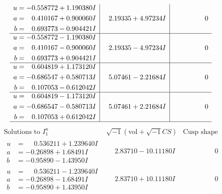 \documentclass[1p]{elsarticle_modified}
\theoremstyle{definition}
\newcommand{\I}{\sqrt{-1}}
\begin{document}
$$\begin{array}{c|c|c}
\begin{aligned}
u &= -0.558772 + 1.190380 I \\
a &= \phantom{-}0.410167 + 0.900060 I \\
b &= \phantom{-}0.693773 - 0.904421 I\end{aligned}
 & \phantom{-}2.19335 + 4.97234 I & \phantom{-0.000000 } 0 \\ \hline\begin{aligned}
u &= -0.558772 - 1.190380 I \\
a &= \phantom{-}0.410167 - 0.900060 I \\
b &= \phantom{-}0.693773 + 0.904421 I\end{aligned}
 & \phantom{-}2.19335 - 4.97234 I & \phantom{-0.000000 } 0 \\ \hline\begin{aligned}
u &= \phantom{-}0.604819 + 1.173120 I \\
a &= -0.686547 + 0.580713 I \\
b &= \phantom{-}0.107053 - 0.612042 I\end{aligned}
 & \phantom{-}5.07461 - 2.21684 I & \phantom{-0.000000 } 0 \\ \hline\begin{aligned}
u &= \phantom{-}0.604819 - 1.173120 I \\
a &= -0.686547 - 0.580713 I \\
b &= \phantom{-}0.107053 + 0.612042 I\end{aligned}
 & \phantom{-}5.07461 + 2.21684 I & \phantom{-0.000000 } 0\\
 \hline 
 \end{array}$$\newpage$$\begin{array}{c|c|c}  
\text{Solutions to }I^u_{1}& \I (\text{vol} + \sqrt{-1}CS) & \text{Cusp shape}\\
 \hline 
\begin{aligned}
u &= \phantom{-}0.536211 + 1.239640 I \\
a &= -0.26898 + 1.68491 I \\
b &= -0.95890 - 1.43950 I\end{aligned}
 & \phantom{-}2.83710 - 10.11180 I & \phantom{-0.000000 } 0 \\ \hline\begin{aligned}
u &= \phantom{-}0.536211 - 1.239640 I \\
a &= -0.26898 - 1.68491 I \\
b &= -0.95890 + 1.43950 I\end{aligned}
 & \phantom{-}2.83710 + 10.11180 I & \phantom{-0.000000 } 0 \\ \hline\begin{aligned}

\end{aligned}
\end{array}$$
\end{document}
